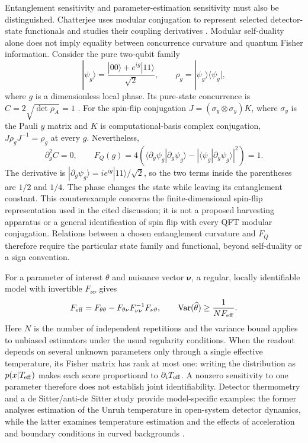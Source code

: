 \documentclass[pdflatex,sn-mathphys-num]{sn-jnl}
\begin{document}
Entanglement sensitivity and parameter-estimation sensitivity must also be distinguished. Chatterjee uses modular conjugation to represent selected detector-state functionals and studies their coupling derivatives \cite{Chatterjee2025Modular}. Modular self-duality alone does not imply equality between concurrence curvature and quantum Fisher information. Consider the pure two-qubit family
\begin{equation}
|\psi_g\rangle=\frac{|00\rangle+e^{ig}|11\rangle}{\sqrt2},
\qquad \rho_g=|\psi_g\rangle\langle\psi_g|,
\label{eq:phase-family-counterexample}
\end{equation}
where $g$ is a dimensionless local phase. Its pure-state concurrence is $C=2\sqrt{\det\rho_A}=1$ \cite{Wootters1998}. For the spin-flip conjugation $J=(\sigma_y\otimes\sigma_y)K$, where $\sigma_y$ is the Pauli $y$ matrix and $K$ is computational-basis complex conjugation, $J\rho_gJ^{-1}=\rho_g$ at every $g$. Nevertheless,
\begin{equation}
\partial_g^2 C=0,\qquad
F_Q(g)=4\!\left(\langle\partial_g\psi_g|\partial_g\psi_g\rangle
-|\langle\psi_g|\partial_g\psi_g\rangle|^2\right)=1.
\label{eq:curvature-qfi-counterexample}
\end{equation}
The derivative is $|\partial_g\psi_g\rangle=i e^{ig}|11\rangle/\sqrt2$, so the two terms inside the parentheses are $1/2$ and $1/4$. The phase changes the state while leaving its entanglement constant. This counterexample concerns the finite-dimensional spin-flip representation used in the cited discussion; it is not a proposed harvesting apparatus or a general identification of spin flip with every QFT modular conjugation. Relations between a chosen entanglement curvature and $F_Q$ therefore require the particular state family and functional, beyond self-duality or a sign convention.

For a parameter of interest $\theta$ and nuisance vector $\boldsymbol\nu$, a regular, locally identifiable model with invertible $F_{\nu\nu}$ gives
\begin{equation}
F_{\rm eff}=F_{\theta\theta}-F_{\theta\nu}F_{\nu\nu}^{-1}F_{\nu\theta},\qquad
\operatorname{Var}(\widehat\theta)\geq\frac1{N F_{\rm eff}}.
\label{eq:effective-fi}
\end{equation}
Here $N$ is the number of independent repetitions and the variance bound applies to unbiased estimators under the usual regularity conditions. When the readout depends on several unknown parameters only through a single effective temperature, its Fisher matrix has rank at most one: writing the distribution as $p(x|T_{\rm eff})$ makes each score proportional to $\partial_iT_{\rm eff}$. A nonzero sensitivity to one parameter therefore does not establish joint identifiability. Detector thermometry and a de Sitter/anti-de Sitter study provide model-specific examples: the former analyses estimation of the Unruh temperature in open-system detector dynamics, while the latter examines temperature estimation and the effects of acceleration and boundary conditions in curved backgrounds \cite{TianWangFanJing2015,DuMann2021}.
\end{document}
